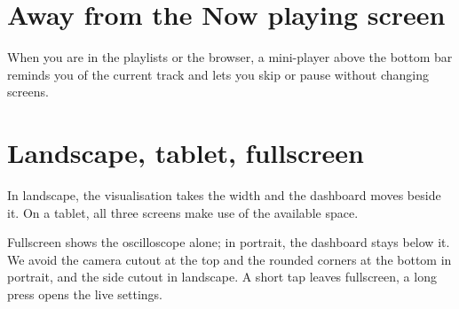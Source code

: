\section{Away from the Now playing screen}
When you are in the playlists or the browser, a mini-player above the bottom bar reminds you of the current track
and lets you skip or pause without changing screens.

\section{Landscape, tablet, fullscreen}
In landscape, the visualisation takes the width and the dashboard moves beside it. On a tablet, all three screens
make use of the available space.


Fullscreen shows the oscilloscope alone; in portrait, the dashboard stays below it. We avoid the camera cutout at the
top and the rounded corners at the bottom in portrait, and the side cutout in landscape. A short tap leaves
fullscreen, a long press opens the live settings.
